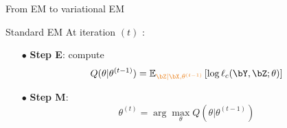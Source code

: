 \documentclass[compress,10pt]{beamer}
\begin{document}
\begin{frame}{From EM to variational EM}
 
\begin{block}{Standard EM}
At iteration $(t)$ : 
\begin{itemize}
 \item[$\bullet$]\textbf{Step E}: compute 
 $$ Q(\theta | \theta^{(t-1)}) =   \mathbb E_{\color{dgreen}\bZ | \bX, \theta^{(t-1)} } \left[\log \ell_c(\bY,\bZ; \theta)  \right] $$
 \item[$\bullet$]\textbf{Step M}: 
 $$ \theta^{(t)} = \arg \max_{\theta} Q(\theta | \theta^{(t-1)})$$
 \end{itemize}
% 
%
% 
\end{block}
 
 \end{frame}
\end{document}
